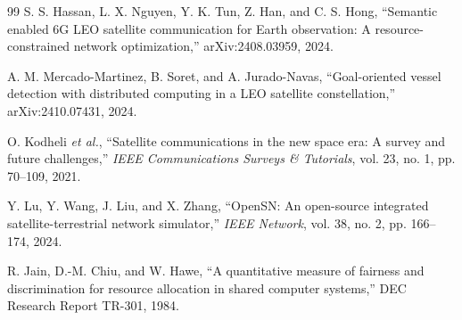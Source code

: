 \documentclass[conference]{IEEEtran}
\begin{document}
\begin{thebibliography}{99}
S. S. Hassan, L. X. Nguyen, Y. K. Tun, Z. Han, and C. S. Hong, ``Semantic enabled 6G LEO satellite communication for Earth observation: A resource-constrained network optimization,'' arXiv:2408.03959, 2024.

A. M. Mercado-Martinez, B. Soret, and A. Jurado-Navas, ``Goal-oriented vessel detection with distributed computing in a LEO satellite constellation,'' arXiv:2410.07431, 2024.

O. Kodheli \emph{et al.}, ``Satellite communications in the new space era: A survey and future challenges,'' \emph{IEEE Communications Surveys \& Tutorials}, vol. 23, no. 1, pp. 70--109, 2021.

Y. Lu, Y. Wang, J. Liu, and X. Zhang, ``OpenSN: An open-source integrated satellite-terrestrial network simulator,'' \emph{IEEE Network}, vol. 38, no. 2, pp. 166--174, 2024.

R. Jain, D.-M. Chiu, and W. Hawe, ``A quantitative measure of fairness and discrimination for resource allocation in shared computer systems,'' DEC Research Report TR-301, 1984.

\end{thebibliography}
\end{document}
